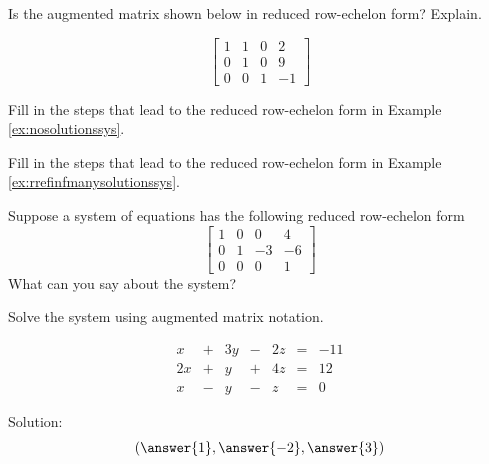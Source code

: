 \documentclass{ximera}
\begin{document}
   \begin{problem}\label{prob:rrefmultchoice5}
Is the augmented matrix shown below in reduced row-echelon form?  Explain.
   
  $$\left[\begin{array}{ccc|c}  
 1&1&0&2\\0&1&0&9\\0&0&1&-1
 \end{array}\right]$$
 \begin{multipleChoice}
 \end{multipleChoice}
  \end{problem}
  
\begin{problem}\label{prob:rrefnosolutionssys}
Fill in the steps that lead to the reduced row-echelon form in Example \ref{ex:nosolutionssys}.
\end{problem}

\begin{problem}\label{prob:rreffinfmanysolutionsys}
Fill in the steps that lead to the reduced row-echelon form in Example \ref{ex:rrefinfmanysolutionssys}.
\end{problem}

\begin{problem} \label{prob:numberofsolutionsmultch}
Suppose a system of equations has the following reduced row-echelon form
  $$\left[\begin{array}{ccc|c}  
 1&0&0&4\\0&1&-3&-6\\0&0&0&1
 \end{array}\right]$$
 What can you say about the system?
 \begin{multipleChoice}
 \end{multipleChoice}
  \end{problem}
  
\begin{problem}\label{prob:sys20solvesys1}
Solve the system using augmented matrix notation.

$$\begin{array}{ccccccc}
      x & +&3y&-&2z&= &-11 \\
	 2x& +&y&+&4z&=&12\\
     x& -&y&-&z&=&0
    \end{array}$$
    
    Solution:
    $$( \answer{1}, \answer{-2}, \answer{3})$$
\end{problem}
\end{document}
